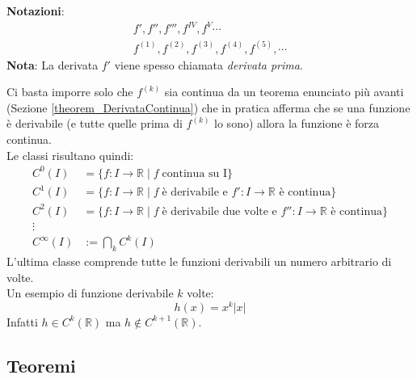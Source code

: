 \textbf{Notazioni}:
\begin{gather*}
	f', f'', f''', f^{IV}, f^{V} \cdots\\
	f^{(1)}, f^{(2)}, f^{(3)}, f^{(4)}, f^{(5)}, \cdots
\end{gather*}
\textbf{Nota}: La derivata $f'$ viene spesso chiamata \textit{derivata prima}.

Ci basta imporre solo che $f^{(k)}$ sia continua da un teorema enunciato più 
avanti (Sezione \ref{theorem_DerivataContinua}) che in pratica afferma che se 
una funzione è derivabile (e tutte quelle prima di $f^{(k)}$ lo sono) allora la 
funzione è forza continua.\\

Le classi risultano quindi:
\begin{align*}
	C^0 (I) &= \{f: I \to \mathbb{R}\; |\; f \; \text{continua su I}\}\\
	C^1 (I) &= \{f: I \to \mathbb{R}\; |\; f \; \text{è derivabile e } f':I \to 
    \mathbb{R} \text{ è continua}\}\\
	C^2 (I) &= \{f: I \to \mathbb{R}\; |\; f \; \text{è derivabile due volte 
    e } f'':I \to \mathbb{R} \text{ è continua}\}\\
	\vdots\\
	C^\infty (I) &:= \bigcap_{k} C^k (I)
\end{align*}
L'ultima classe comprende tutte le funzioni derivabili un numero arbitrario di 
volte.\\

Un esempio di funzione derivabile $k$ volte:
\begin{equation*}
	h(x) = x^k |x|  
\end{equation*}
Infatti $h \in C^k (\mathbb{R})$ ma $h \not \in C^{k+1} (\mathbb{R})$.

\subsection{Teoremi}

